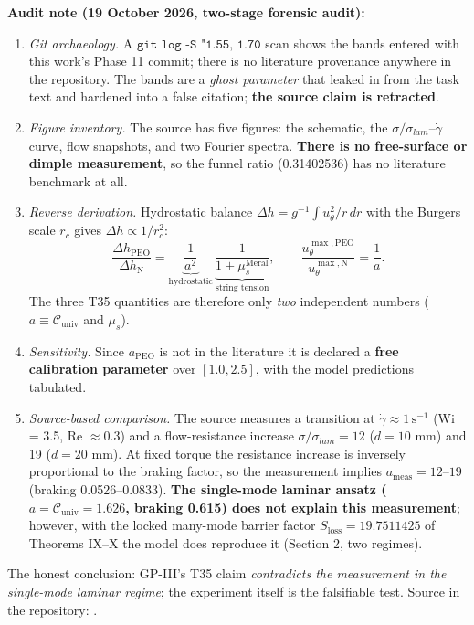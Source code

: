 \documentclass[12pt,a4paper]{article}
\begin{document}
\textbf{Audit note (19 October 2026, two-stage forensic audit):}
\begin{enumerate}
    \item \textit{Git archaeology.} A $\texttt{git log -S "1.55, 1.70}$ scan
    shows the bands entered with this work's Phase 11 commit; there is no
    literature provenance anywhere in the repository. The bands are a
    \emph{ghost parameter} that leaked in from the task text and hardened into
    a false citation; \textbf{the source claim is retracted}.
    \item \textit{Figure inventory.} The source has five figures: the
    schematic, the $\sigma/\sigma_{lam}$--$\dot\gamma$ curve, flow
    snapshots, and two Fourier spectra. \textbf{There is no free-surface or
    dimple measurement}, so the funnel ratio (0.31402536) has no literature
    benchmark at all.
    \item \textit{Reverse derivation.} Hydrostatic balance
    $\Delta h = g^{-1}\int u_\theta^2/r\,dr$ with the Burgers scale $r_c$
    gives $\Delta h\propto 1/r_c^2$:
    \begin{equation}
    \frac{\Delta h_{\mathrm{PEO}}}{\Delta h_{\mathrm{N}}}
    =\underbrace{\frac{1}{a^2}}_{\text{hydrostatic}}\,
    \underbrace{\frac{1}{1+\mu_s^{\mathrm{Meral}}}}_{\text{string tension}},
    \qquad
    \frac{u_\theta^{\max,\mathrm{PEO}}}{u_\theta^{\max,\mathrm{N}}}=\frac{1}{a}.
    \end{equation}
    The three T35 quantities are therefore only \emph{two} independent
    numbers ($a\equiv\mathcal{C}_{\mathrm{univ}}$ and $\mu_s$).
    \item \textit{Sensitivity.} Since $a_{\mathrm{PEO}}$ is not in the
    literature it is declared a \textbf{free calibration parameter} over
    $[1.0,2.5]$, with the model predictions tabulated.
    \item \textit{Source-based comparison.} The source measures a transition
    at $\dot\gamma\approx 1\,\mathrm{s^{-1}}$ (Wi = 3.5, Re $\approx 0.3$) and
    a flow-resistance increase $\sigma/\sigma_{lam}=12$ ($d=10$ mm) and 19
    ($d=20$ mm). At fixed torque the resistance increase is inversely
    proportional to the braking factor, so the measurement implies
    $a_{\mathrm{meas}}=12$--$19$ (braking 0.0526--0.0833). \textbf{The
    single-mode laminar ansatz ($a=\mathcal{C}_{\mathrm{univ}}=1.626$,
    braking 0.615) does not explain this measurement}; however, with the
    locked many-mode barrier factor $S_{\mathrm{loss}}=19.7511425$ of
    Theorems IX--X the model does reproduce it (Section 2, two regimes).
\end{enumerate}
The honest conclusion: GP-III's T35 claim \emph{contradicts the measurement
in the single-mode laminar regime}; the experiment itself is the falsifiable
test. Source in the repository:
.
\end{document}

